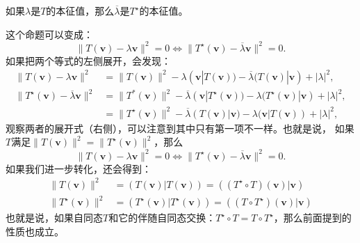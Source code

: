 \documentclass[12pt,UTF8,fontset=none]{ctexbook}
\begin{document}
如果$\lambda$是$T$的本征值，那么$\overline{\lambda}$是$T^\star$的本征值。

这个命题可以变成：
$$ \| T(\mathbf{v}) - \lambda \mathbf{v}\|^2 = 0 \Leftrightarrow \| T^\star(\mathbf{v}) - \overline{\lambda} \mathbf{v}\|^2 = 0.$$
如果把两个等式的左侧展开，会发现：
\begin{align*}
    \| T(\mathbf{v}) - \lambda \mathbf{v}\|^2 &= \| T(\mathbf{v})\|^2 - \lambda (\mathbf{v} | T(\mathbf{v})) - \overline{\lambda} (T(\mathbf{v}) | \mathbf{v}) + |\lambda|^2,  \\
    \| T^\star(\mathbf{v}) - \overline{\lambda} \mathbf{v}\|^2 &= \| T^*(\mathbf{v})\|^2 -  \overline{\lambda} (\mathbf{v} | T^\star(\mathbf{v})) - \lambda (T^\star(\mathbf{v}) | \mathbf{v}) + |\lambda|^2,  \\
    &= \| T^\star(\mathbf{v})\|^2 -  \overline{\lambda} (T(\mathbf{v}) | \mathbf{v}) - \lambda (\mathbf{v} | T(\mathbf{v})) + |\lambda|^2, 
\end{align*}
观察两者的展开式（右侧），可以注意到其中只有第一项不一样。也就是说，
如果$T$满足$\| T(\mathbf{v})\|^2 = \| T^\star(\mathbf{v})\|^2$，那么
$$ \| T(\mathbf{v}) - \lambda \mathbf{v}\|^2 = 0 \Leftrightarrow \| T^\star(\mathbf{v}) - \overline{\lambda} \mathbf{v}\|^2 = 0.$$
如果我们进一步转化，还会得到：
\begin{align*}
    \| T(\mathbf{v})\|^2 &= (T(\mathbf{v}) | T(\mathbf{v})) = ((T^\star\circ T)(\mathbf{v}) | \mathbf{v})  \\
    \| T^\star(\mathbf{v})\|^2 &= (T^\star(\mathbf{v}) | T^\star(\mathbf{v})) = ((T\circ T^\star)(\mathbf{v}) | \mathbf{v})  
\end{align*}
也就是说，如果自同态$T$和它的伴随自同态交换：$T^\star\circ T = T\circ T^\star$，那么前面提到的性质也成立。
\end{document}
